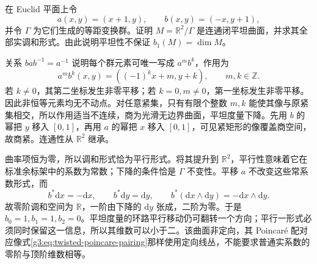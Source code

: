 \begin{exercise}\label{g3:ex:flat-quotient-parallel-invariants}
	在 Euclid 平面上令
	\[
		a(x,y)=(x+1,y),\qquad b(x,y)=(-x,y+1),
	\]
	并令 \(\Gamma\) 为它们生成的等距变换群。证明
	\(M=\mathbb R^2/\Gamma\) 是连通闭平坦曲面，并求其全部实调和形式。由此说明平坦性不保证 \(b_1(M)=\dim M\)。
\end{exercise}
\begin{solution}
	关系 \(bab^{-1}=a^{-1}\) 说明每个群元素可唯一写成
	\(a^m b^k\)，作用为
	\[
		a^m b^k(x,y)=((-1)^k x+m,y+k),
		\qquad m,k\in\mathbb Z.
	\]
	若 \(k\ne0\)，其第二坐标发生非零平移；若 \(k=0,m\ne0\)，第一坐标发生非零平移。因此非恒等元素均无不动点。对任意紧集，只有有限个整数 \(m,k\) 能使其像与原紧集相交，所以作用适当不连续，商为光滑无边界曲面，平坦度量下降。先用 \(b\) 的幂把 \(y\) 移入 \([0,1]\)，再用 \(a\) 的幂把 \(x\) 移入 \([0,1]\)，可见紧矩形的像覆盖商空间，故商紧。连通性从 \(\mathbb R^2\) 继承。

	曲率项恒为零，所以调和形式恰为平行形式。将其提升到 \(\mathbb R^2\)，平行性意味着它在标准余标架中的系数为常数；下降的条件恰是 \(\Gamma\) 不变性。平移 \(a\) 不改变这些常系数形式，而
	\[
		b^*\mathrm dx=-\mathrm dx,\qquad
		b^*\mathrm dy=\mathrm dy,\qquad
		b^*(\mathrm dx\wedge\mathrm dy)
		   =-\mathrm dx\wedge\mathrm dy.
	\]
	故零阶调和空间为 \(\mathbb R\)，一阶由下降的 \(\mathrm dy\) 张成，二阶为零。于是
	\(b_0=1,b_1=1,b_2=0\)。平坦度量的环路平行移动仍可翻转一个方向；平行一形式必须同时保留这一信息，所以其维数可以小于二。该曲面非定向，其 Poincar\'e 配对应像式\eqref{g3:eq:twisted-poincare-pairing}那样使用定向线丛，不能要求普通实系数的零阶与顶阶维数相等。
\end{solution}

